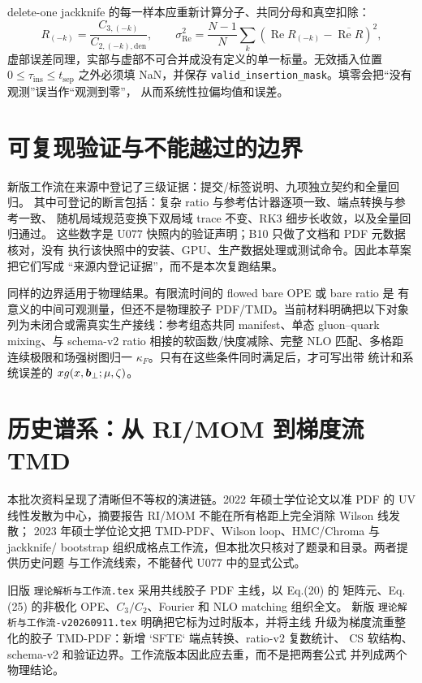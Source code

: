 delete-one jackknife 的每一样本应重新计算分子、共同分母和真空扣除：
\begin{equation}
  R_{(-k)}
  =\frac{C_{3,(-k)}}{C_{2,(-k),\mathrm{den}}},
  \qquad
  \sigma_{\mathrm{Re}}^2=\frac{N-1}{N}\sum_k
  \left(\operatorname{Re}R_{(-k)}
  -\overline{\operatorname{Re}R}\right)^2,
  \label{eq:b10-jk}
\end{equation}
虚部误差同理，实部与虚部不可合并成没有定义的单一标量。无效插入位置
$0\le\tau_{\mathrm{ins}}\le t_{\mathrm{sep}}$ 之外必须填 NaN，并保存
\texttt{valid\_insertion\_mask}。填零会把“没有观测”误当作“观测到零”，
从而系统性拉偏均值和误差。

\section{可复现验证与不能越过的边界}

新版工作流在来源中登记了三级证据：提交/标签说明、九项独立契约和全量回归。
其中可登记的断言包括：复杂 ratio 与参考估计器逐项一致、端点转换与参考一致、
随机局域规范变换下双局域 trace 不变、RK3 细步长收敛，以及全量回归通过。
这些数字是 U077 快照内的验证声明；B10 只做了文档和 PDF 元数据核对，没有
执行该快照中的安装、GPU、生产数据处理或测试命令。因此本草案把它们写成
“来源内登记证据”，而不是本次复跑结果。

同样的边界适用于物理结果。有限流时间的 flowed bare OPE 或 bare ratio 是
有意义的中间可观测量，但还不是物理胶子 PDF/TMD。当前材料明确把以下对象
列为未闭合或需真实生产接线：参考组态共同 manifest、单态 gluon--quark
mixing、与 schema-v2 ratio 相接的软函数/快度减除、完整 NLO 匹配、多格距
连续极限和场强树图归一 $\kappa_F$。只有在这些条件同时满足后，才可写出带
统计和系统误差的 $xg(x,\boldsymbol b_\perp;\mu,\zeta)$。

\section{历史谱系：从 RI/MOM 到梯度流 TMD}

本批次资料呈现了清晰但不等权的演进链。2022 年硕士学位论文以准 PDF 的 UV
线性发散为中心，摘要报告 RI/MOM 不能在所有格距上完全消除 Wilson 线发散；
2023 年硕士学位论文把 TMD-PDF、Wilson loop、HMC/Chroma 与 jackknife/
bootstrap 组织成格点工作流，但本批次只核对了题录和目录。两者提供历史问题
与工作流线索，不能替代 U077 中的显式公式。

旧版 \texttt{理论解析与工作流.tex} 采用共线胶子 PDF 主线，以 Eq.(20) 的
矩阵元、Eq.(25) 的非极化 OPE、$C_3/C_2$、Fourier 和 NLO matching 组织全文。
新版 \texttt{理论解析与工作流-v20260911.tex} 明确把它标为过时版本，并将主线
升级为梯度流重整化的胶子 TMD-PDF：新增 `SFTE` 端点转换、ratio-v2 复数统计、
CS 软结构、schema-v2 和验证边界。工作流版本因此应去重，而不是把两套公式
并列成两个物理结论。

